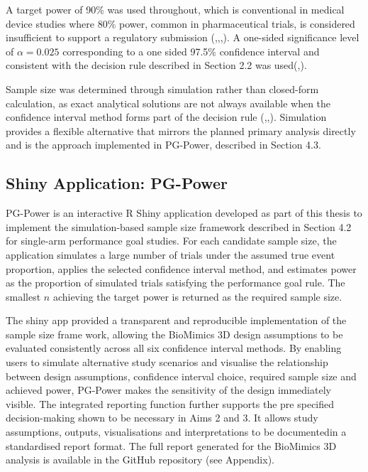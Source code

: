 \documentclass{article}
\begin{document}
A target power of 90\% was used throughout, which is conventional in
medical device studies where 80\% power, common in pharmaceutical
trials, is considered insufficient to support a regulatory submission
(,,,).
A one-sided significance level of \(\alpha = 0.025\) corresponding to a
one sided 97.5\% confidence interval and consistent with the decision
rule described in Section 2.2 was
used(,).

Sample size was determined through simulation rather than closed-form
calculation, as exact analytical solutions are not always available when
the confidence interval method forms part of the decision rule
(,,).
Simulation provides a flexible alternative that mirrors the planned
primary analysis directly and is the approach implemented in PG-Power,
described in Section 4.3.

\subsection{Shiny Application:
PG-Power}\label{shiny-application-pg-power}

PG-Power is an interactive R Shiny application developed as part of this
thesis to implement the simulation-based sample size framework described
in Section 4.2 for single-arm performance goal studies. For each
candidate sample size, the application simulates a large number of
trials under the assumed true event proportion, applies the selected
confidence interval method, and estimates power as the proportion of
simulated trials satisfying the performance goal rule. The smallest
\(n\) achieving the target power is returned as the required sample
size.

The shiny app provided a transparent and reproducible implementation of
the sample size frame work, allowing the BioMimics 3D design assumptions
to be evaluated consistently across all six confidence interval methods.
By enabling users to simulate alternative study scenarios and visualise
the relationship between design assumptions, confidence interval choice,
required sample size and achieved power, PG-Power makes the sensitivity
of the design immediately visible. The integrated reporting function
further supports the pre specified decision-making shown to be necessary
in Aims 2 and 3. It allows study assumptions, outputs, visualisations
and interpretations to be documentedin a standardised report format. The
full report generated for the BioMimics 3D analysis is available in the
GitHub repository (see Appendix).
\end{document}
